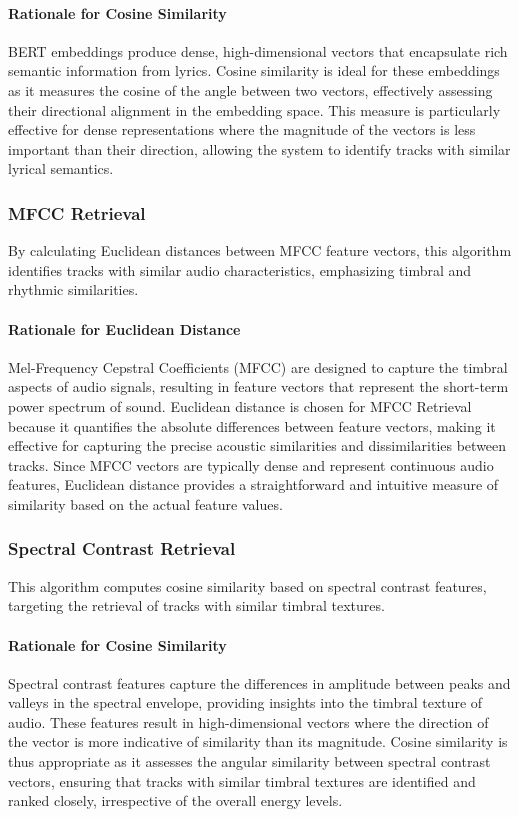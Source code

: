 \documentclass[sigconf]{acmart}
\begin{document}
\paragraph{Rationale for Cosine Similarity}
BERT embeddings produce dense, high-dimensional vectors that encapsulate rich semantic information from lyrics. Cosine similarity is ideal for these embeddings as it measures the cosine of the angle between two vectors, effectively assessing their directional alignment in the embedding space. This measure is particularly effective for dense representations where the magnitude of the vectors is less important than their direction, allowing the system to identify tracks with similar lyrical semantics.

\subsubsection{MFCC Retrieval}
By calculating Euclidean distances between MFCC feature vectors, this algorithm identifies tracks with similar audio characteristics, emphasizing timbral and rhythmic similarities.

\paragraph{Rationale for Euclidean Distance}
Mel-Frequency Cepstral Coefficients (MFCC) are designed to capture the timbral aspects of audio signals, resulting in feature vectors that represent the short-term power spectrum of sound. Euclidean distance is chosen for MFCC Retrieval because it quantifies the absolute differences between feature vectors, making it effective for capturing the precise acoustic similarities and dissimilarities between tracks. Since MFCC vectors are typically dense and represent continuous audio features, Euclidean distance provides a straightforward and intuitive measure of similarity based on the actual feature values.

\subsubsection{Spectral Contrast Retrieval}
This algorithm computes cosine similarity based on spectral contrast features, targeting the retrieval of tracks with similar timbral textures.

\paragraph{Rationale for Cosine Similarity}
Spectral contrast features capture the differences in amplitude between peaks and valleys in the spectral envelope, providing insights into the timbral texture of audio. These features result in high-dimensional vectors where the direction of the vector is more indicative of similarity than its magnitude. Cosine similarity is thus appropriate as it assesses the angular similarity between spectral contrast vectors, ensuring that tracks with similar timbral textures are identified and ranked closely, irrespective of the overall energy levels.
\end{document}
